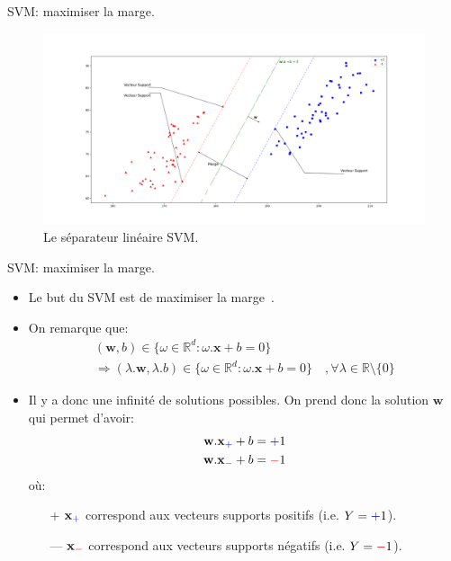 \documentclass[8pt]{beamer}
\begin{document}
		\begin{frame}{SVM\@: maximiser la marge.}
			\begin{figure}[H]
				\includegraphics[width=\textwidth]{images/samples/svm}
				\caption*{ Le séparateur linéaire SVM.}
			\end{figure}
		\end{frame}

		\begin{frame}{SVM\@: maximiser la marge.}
			\begin{itemize}
				\item  Le but du SVM est de maximiser la marge~\cite{vapnik1998statistical}.
				\item  On remarque que:
				\begin{gather*}
					(\textbf{w}, b) \in \{\omega \in \mathbb{R}^d : \omega.\textbf{x} + b = 0\} \\
					\Rightarrow
					(\lambda . \textbf{w}, \lambda.b) \in \{\omega \in \mathbb{R}^d : \omega.\textbf{x} + b = 0\}\quad, \forall \lambda \in \mathbb{R}\setminus\{0\}
				\end{gather*}
				\item  Il y a donc une infinité de solutions possibles. On prend donc la solution $\textbf{w}$ qui permet d'avoir:
				\begin{align}
					\textbf{w}.\textbf{x}_{\color{blue}+} + b &= {\color{blue}+}1 \\
					\textbf{w}.\textbf{x}_{\color{red}-} + b &= {\color{red}-}1
				\end{align}
				où:
				\begin{itemize}
					\item[{\color{blue}+}] $\textbf{x}_{\color{blue}+}$ correspond aux vecteurs supports positifs (i.e. $Y={\color{blue}+}1$).
					\item[{\color{red}---}] $\textbf{x}_{\color{red}-}$ correspond aux vecteurs supports négatifs (i.e. $Y={\color{red}-}1$).
				\end{itemize}
			\end{itemize}
		\end{frame}
\end{document}
